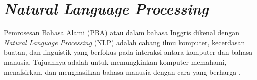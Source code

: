 \section{\textit{Natural Language Processing}}

Pemrosesan Bahasa Alami (PBA) atau dalam bahasa Inggris dikenal dengan \textit{Natural Language Processing} (NLP) adalah cabang ilmu komputer, kecerdasan buatan, dan linguistik yang berfokus pada interaksi antara komputer dan bahasa manusia. Tujuannya adalah untuk memungkinkan komputer memahami, menafsirkan, dan menghasilkan bahasa manusia dengan cara yang berharga \parencite{nlp}.

